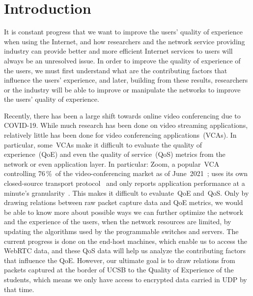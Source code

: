 \section{Introduction}\label{introduction}
    It is constant progress that we want to improve the users' quality of experience when using the Internet, and how researchers and the network service providing industry can provide better and more efficient Internet services to users will always be an unresolved issue. In order to improve the quality of experience of the users, we must first understand what are the contributing factors that influence the users' experience, and later, building from these results, researchers or the industry will be able to improve or manipulate the networks to improve the users' quality of experience.

    Recently, there has been a large shift towards online video conferencing due to COVID-19. While much research has been done on video streaming applications, relatively little has been done for video conferencing applications~(VCAs). In particular, some~VCAs make it difficult to evaluate the quality of experience~(QoE) and even the quality of service~(QoS) metrics from the network or even application layer. In particular: Zoom, a popular~VCA controlling 76\,\%~of the video-conferencing market as of June~2021~\autocite{kim2021}; uses its own closed-source transport protocol~\autocite{marczak2020} and only reports application performance at a minute's granularity~\autocite{walia2019}. This makes it difficult to evaluate~QoE and~QoS. Only by drawing relations between raw packet capture data and QoE metrics, we would be able to know more about possible ways we can further optimize the network and the experience of the users, when the network resources are limited, by updating the algorithms used by the programmable switches and servers. The current progress is done on the end-host machines, which enable us to access the WebRTC data, and these QoS data will help us analyze the contributing factors that influence the QoE. However, our ultimate goal is to draw relations from packets captured at the border of UCSB to the Quality of Experience of the students, which means we only have access to encrypted data carried in UDP by that time. 

